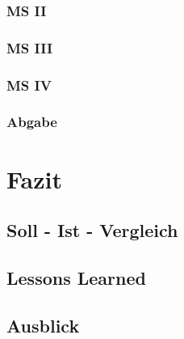 \documentclass{article}
\begin{document}
\vspace{1cm}
\subsubsection{MS II}

\vspace{1cm}
\subsubsection{MS III}

\vspace{1cm}
\subsubsection{MS IV}

\vspace{1cm}
\subsubsection{Abgabe}

\newpage
\section{Fazit}

\vspace{2cm}
\subsection{Soll - Ist - Vergleich}

\vspace{2cm}
\subsection{Lessons Learned}

\vspace{2cm}
\subsection{Ausblick}
	
\end{document}
